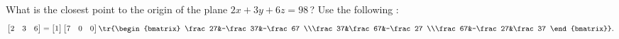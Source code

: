 \begin{activity}
What is the closest point to the origin of the plane \(2x+3y+6z=98\)\,? 
Use the following \svd:
\begin{equation*}
\begin{bmatrix} 2&3&6 \end{bmatrix}
=\begin{bmatrix} 1 \end{bmatrix}
\begin{bmatrix} 7&0&0 \end{bmatrix}
\tr{\begin{bmatrix} \frac27&-\frac37&-\frac67
\\\frac37&\frac67&-\frac27
\\\frac67&-\frac27&\frac37 \end{bmatrix}}.
\end{equation*}
\end{activity}





